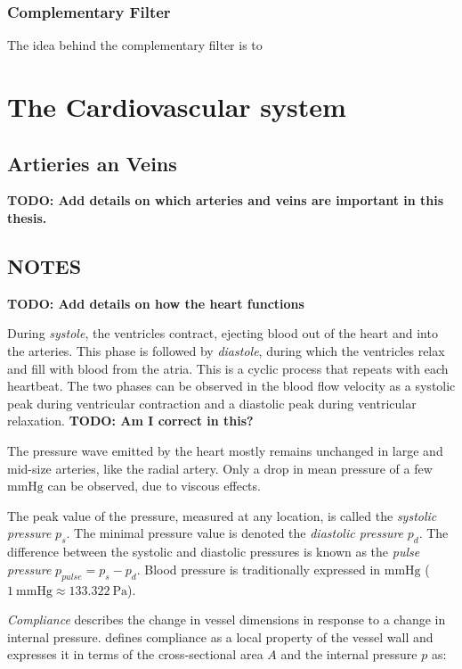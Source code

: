 \subsubsection{Complementary Filter}

The idea behind the complementary filter is to 

\section{The Cardiovascular system}

\subsection{Artieries an Veins}

\textbf{TODO: Add details on which arteries and veins are important in this thesis.}

\subsection{NOTES}

\textbf{TODO: Add details on how the heart functions}

During \textit{systole}, the ventricles contract, ejecting blood out of the heart and into the arteries. This phase is followed by \textit{diastole}, during which the ventricles relax and fill with blood from the atria. This is a cyclic process that repeats with each heartbeat. The two phases can be observed in the blood flow velocity as a systolic peak during ventricular contraction and a diastolic peak during ventricular relaxation. \textbf{TODO: Am I correct in this?}

The pressure wave emitted by the heart mostly remains unchanged in large and mid-size arteries, like the radial artery. Only a drop in mean pressure of a few $\si{\mmHg}$ can be observed, due to viscous effects. 

The peak value of the pressure, measured at any location, is called the \textit{systolic pressure} $p_s$. The minimal pressure value is denoted the \textit{diastolic pressure} $p_d$. The difference between the systolic and diastolic pressures is known as the \textit{pulse pressure} $p_{pulse} = p_s - p_d$. Blood pressure is traditionally expressed in $\si{\mmHg}$ ($\SI{1}{\mmHg} \approx \SI{133.322}{\pascal}$).

\textit{Compliance} describes the change in vessel dimensions in response to a change in internal pressure. \textcite{hellevik_cardiovascular} defines compliance as a local property of the vessel wall and expresses it in terms of the cross-sectional area $A$ and the internal pressure $p$ as:

